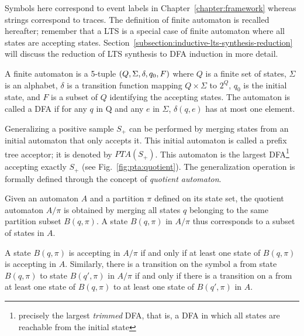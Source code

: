 Symbols here correspond to event labels in Chapter~\ref{chapter:framework} whereas strings correspond to traces. The definition of finite automaton is recalled hereafter; remember that a LTS is a special case of finite automaton where all states are accepting states. Section~\ref{subsection:inductive-lts-synthesis-reduction} will discuss the reduction of LTS synthesis to DFA induction in more detail. 

\begin{definition}
A finite automaton is a 5-tuple $(Q,\Sigma,\\\delta,q_0,F)$ where $Q$ is a finite set of states, $\Sigma$ is an alphabet, $\delta$ is a transition function mapping $Q\times\Sigma$ to $2^Q$, $q_0$ is the initial state, and $F$ is a subset of $Q$ identifying the accepting states. The automaton is called a DFA if for any $q$ in Q and any $e$ in $\Sigma$, $\delta(q,e)$ has at most one element. 
\end{definition}

Generalizing a positive sample $S_+$ can be performed by merging states from an initial automaton that only accepts it. This initial automaton is called a prefix tree acceptor; it is denoted by $PTA(S_+)$. This automaton is the largest DFA\footnote{precisely the largest \emph{trimmed} DFA, that is, a DFA in which all states are reachable from the initial state} accepting exactly $S_+$ (see Fig.~\ref{fig:pta:quotient}). The generalization operation is formally defined through the concept of \emph{quotient automaton}.

\begin{definition}
Given an automaton $A$ and a partition $\pi$ defined on its state set, the quotient automaton $A/\pi$ is obtained by merging all states $q$ belonging to the same partition subset $B(q,\pi)$. A state $B(q,\pi)$ in $A/\pi$ thus corresponds to a subset of states in $A$. 

A state $B(q,\pi)$ is accepting in $A/\pi$ if and only if at least one state of $B(q,\pi)$ is accepting in $A$. Similarly, there is a transition on the symbol $\mathrm{a}$ from state $B(q,\pi)$ to state $B(q',\pi)$ in $A/\pi$ if and only if there is a transition on $\mathrm{a}$ from at least one state of $B(q,\pi)$ to at least one state of $B(q',\pi)$ in $A$. 
\end{definition}

